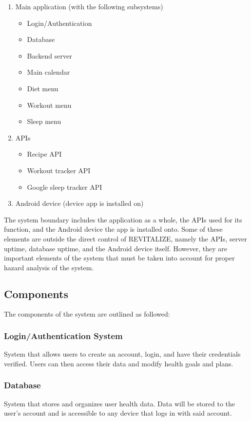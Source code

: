 \documentclass{article}
\begin{document}
\begin{enumerate}
	\item Main application (with the following subsystems)
	\begin{itemize}
		\item Login/Authentication
		\item Database
		\item Backend server
		\item Main calendar
		\item Diet menu
		\item Workout menu
		\item Sleep menu
	\end{itemize}
	\item APIs
	\begin{itemize}
		\item Recipe API
		\item Workout tracker API
		\item Google sleep tracker API
	\end{itemize}
	\item Android device (device app is installed on)
\end{enumerate}

\noindent The system boundary includes the application as a whole, the APIs used for its function, and the Android device the app is installed onto. Some of these elements are outside the direct control of REVITALIZE, namely the APIs, server uptime, database uptime, and the Android device itself. However, they are important elements of the system that must be taken into account for proper hazard analysis of the system.

\subsection{Components}

\noindent The components of the system are outlined as followed:

\subsubsection{Login/Authentication System}
\noindent System that allows users to create an account, login, and have their credentials verified. Users can then access their data and modify health goals and plans.

\subsubsection{Database}
\noindent System that stores and organizes user health data. Data will be stored to the user's account and is accessible to any device that logs in with said account.
\end{document}
